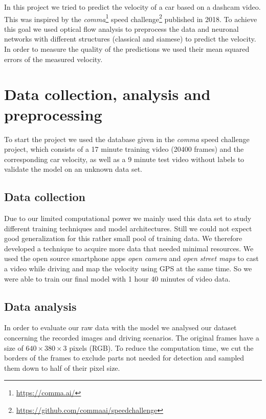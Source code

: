 \documentclass[conference]{IEEEtran}
\begin{document}
In this project we tried to predict the velocity of a car based on a dashcam video. This was inspired by  the \emph{comma}\footnote{\url{https://comma.ai/}} speed challenge\footnote{\url{https://github.com/commaai/speedchallenge}} published in 2018. To achieve this goal we used optical flow analysis to preprocess the data and neuronal networks with different structures (classical and siamese) to predict the velocity. In order to measure the quality of the predictions we used their mean squared errors of the measured velocity.

\section{Data collection, analysis and preprocessing}

To start the project we used the database given in the \emph{comma} speed challenge project, which consists of a 17 minute training video (20400 frames) and the corresponding car velocity, as well as a 9 minute test video without labels to validate the model on an unknown data set.

\subsection{Data collection}

Due to our limited computational power we mainly used this data set to study different training techniques and model architectures. Still we could not expect good generalization for this rather small pool of training data. We therefore developed a technique to acquire more data that needed minimal resources. We used the open source smartphone apps \emph{open camera} and \emph{open street maps} to cast a video while driving and map the velocity using GPS at the same time. So we were able to train our final model with 1 hour 40 minutes of video data.

\subsection{Data analysis}

In order to evaluate our raw data with the model we analysed our dataset concerning the recorded images and driving scenarios. The original frames have a size of $640\times380\times3$ pixels (RGB). To reduce the computation time, we cut the borders of the frames to exclude parts not needed for detection and sampled them down to half of their pixel size.
\end{document}

